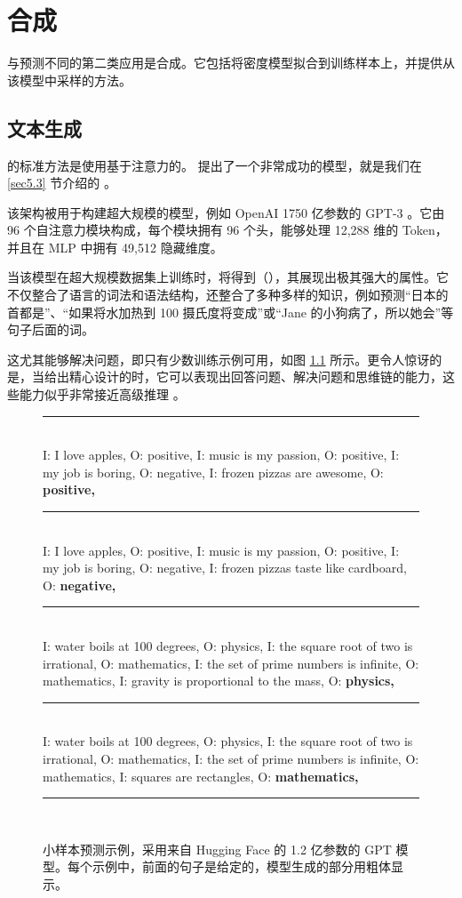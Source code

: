 \chapter{合成}\label{ch7}

与预测不同的第二类应用是合成。它包括将密度模型拟合到训练样本上，并提供从该模型中采样的方法。

\section{文本生成}\label{sec7.1}

的标准方法是使用基于注意力的。\cite{Radford2018} 提出了一个非常成功的模型，就是我们在 \ref{sec5.3} 节介绍的 。

该架构被用于构建超大规模的模型，例如 OpenAI 1750 亿参数的 GPT-3 \citep{arxiv-2005.14165}。它由 96 个自注意力模块构成，每个模块拥有 96 个头，能够处理 12,288 维的 Token，并且在 MLP 中拥有 49,512 隐藏维度。

当该模型在超大规模数据集上训练时，将得到（），其展现出极其强大的属性。它不仅整合了语言的词法和语法结构，还整合了多种多样的知识，例如预测``日本的首都是''、``如果将水加热到 100 摄氏度将变成''或``Jane 的小狗病了，所以她会''等句子后面的词。

这尤其能够解决问题，即只有少数训练示例可用，如图 \ref{fig7.1} 所示。更令人惊讶的是，当给出精心设计的时，它可以表现出回答问题、解决问题和思维链的能力，这些能力似乎非常接近高级推理 \citep{arxiv-2204.02311, arxiv-2303.12712}。

\begin{figure}
    \par{\fontsize{9pt}{11pt}
        \hrule
        ~ \\
        I: I love apples, O: positive, I: music is my passion, O: positive, I: my job is boring, O: negative, I: frozen pizzas are awesome, O: \textbf{positive,} \\
        \hrule
        ~ \\
        I: I love apples, O: positive, I: music is my passion, O: positive, I: my job is boring, O: negative, I: frozen pizzas taste like cardboard, O: \textbf{negative,} \\
        \hrule
        ~ \\
        I: water boils at 100 degrees, O: physics, I: the square root of two is irrational, O: mathematics, I: the set of prime numbers is infinite, O: mathematics, I: gravity is proportional to the mass, O: \textbf{physics,} \\
        \hrule
        ~ \\
        I: water boils at 100 degrees, O: physics, I: the square root of two is irrational, O: mathematics, I: the set of prime numbers is infinite, O: mathematics, I: squares are rectangles, O: \textbf{mathematics,} \\
        \hrule
        ~ \\
    }
    \caption[用 GPT 进行小样本预测]{小样本预测示例，采用来自 Hugging Face 的 1.2 亿参数的 GPT 模型。每个示例中，前面的句子是给定的，模型生成的部分用粗体显示。}
    \label{fig7.1}
\end{figure}

